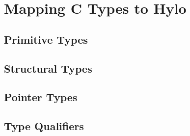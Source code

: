 \section{Mapping C Types to Hylo}

\subsection{Primitive Types}

\subsection{Structural Types}

\subsection{Pointer Types}

\subsection{Type Qualifiers}

